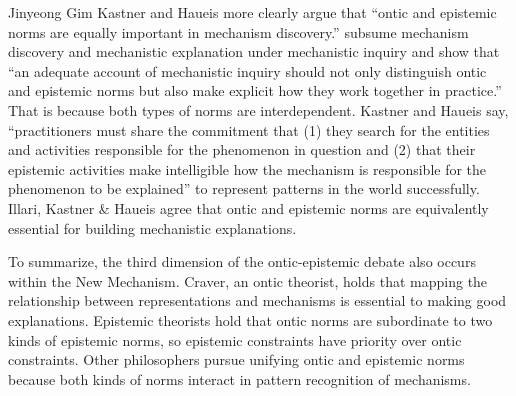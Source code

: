 \begin{artengenv}{Jinyeong Gim}
Kastner and Haueis
\parencite*[][p.1636]{kastner_discovering_2021} %
 more clearly argue that ``ontic and epistemic norms are equally important in mechanism discovery.'' 
\parencite[][p.1637]{kastner_discovering_2021} %
 subsume mechanism discovery and mechanistic explanation under mechanistic inquiry and show that ``an adequate account of mechanistic inquiry should not only distinguish ontic and epistemic norms but also make explicit how they work together in practice.'' That is because both types of norms are interdependent. Kastner and Haueis 
\parencite*[][p.1658]{kastner_discovering_2021} %
 say, ``practitioners must share the commitment that (1) they search for the entities and activities responsible for the phenomenon in question and (2) that their epistemic activities make intelligible how the mechanism is responsible for the phenomenon to be explained'' to represent patterns in the world successfully. Illari, Kastner \& Haueis agree that ontic and epistemic norms are equivalently essential for building mechanistic explanations.

To summarize, the third dimension of the ontic-epistemic debate also occurs within the New Mechanism. Craver, an ontic theorist, holds that mapping the relationship between representations and mechanisms is essential to making good explanations. Epistemic theorists hold that ontic norms are subordinate to two kinds of epistemic norms, so epistemic constraints have priority over ontic constraints. Other philosophers pursue unifying ontic and epistemic norms because both kinds of norms interact in pattern recognition of mechanisms.


\end{artengenv}

